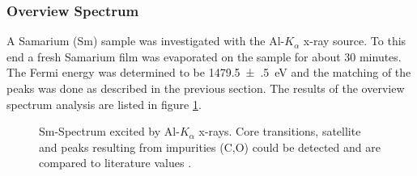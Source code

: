 \documentclass[a4paper]{scrartcl}
\numberwithin{equation}{section}
\numberwithin{figure}{section}
\numberwithin{table}{section}
\begin{document}
\subsubsection{Overview Spectrum}
A Samarium (Sm) sample was investigated with the Al-$K_\alpha$ x-ray source. To this end a fresh Samarium film was evaporated on the sample for about 30 minutes. The Fermi energy was determined to be \SI{1479.5(5)}{eV} and the matching of the peaks was done as described in the previous section. The results of the overview spectrum analysis are listed in figure \ref{fig:sm}.
\begin{figure}[h] 
 \centering
{}       \hfill %
\caption{\small Sm-Spectrum excited by Al-$K_\alpha$ x-rays. Core transitions, satellite and peaks resulting from impurities (C,O) could be detected and are compared to literature values \cite{handbook}. }
  \label{fig:sm}
  \end{figure}
\end{document}
